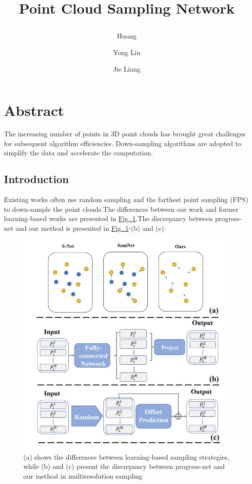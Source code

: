 \documentclass[14pt]{article}
\title{\raggedright{Point Cloud Sampling Network}}
\author[a]{\raggedright{Huang}}
\author[a,*]{\raggedright{Yong Liu}}
\author[a,b]{\raggedright{Jie Liang}}
\affil[a]{\raggedright{Laboratory of Advanced Perception on Robotics and Intelligent Learning, College of Control Science and Engineering, Zhejiang University, Hangzhou, China}}
\affil[b]{\raggedright{Institute of Mechanical and Electrical Engineering, Beijing, China}}
\date{}
\begin{document}
\maketitle

\section{Abstract}
The increasing number of points in 3D point clouds has brought great challenges for subsequent algorithm efficiencies. Down-sampling algorithms are adopted to simplify the data and accelerate the computation.

\begin{multicols}{2}
\section{Introduction}
Existing works  \cite{qi2017pointnet++,hu2020randla,qi2019deep} often use random sampling and the farthest point sampling (FPS) to down-sample the point clouds.The differences between our work and former learning-based works are presented in \href{fig:fig1}{Fig. 1}.The discrepancy between progress-net and our method is presented in \href{fig:fig1}{Fig. 1}-(b) and (c).

\begin{figure}[H]
\includegraphics[scale=0.5]{image1}
\caption{(a) shows the differences between learning-based sampling strategies, while (b) and (c) present the discrepancy between progress-net and our method in multiresolution sampling}
\label{fig:fig1}
\end{figure}


\end{multicols}
\end{document}
